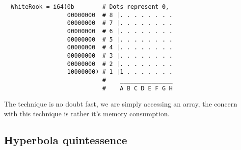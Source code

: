 \newpage
\begin{verbatim}
  WhiteRook = i64(0b        # Dots represent 0,
                  00000000  # 8 |. . . . . . . .
                  00000000  # 7 |. . . . . . . .
                  00000000  # 6 |. . . . . . . .
                  00000000  # 5 |. . . . . . . .
                  00000000  # 4 |. . . . . . . .
                  00000000  # 3 |. . . . . . . .
                  00000000  # 2 |. . . . . . . .
                  10000000) # 1 |1 . . . . . . .
                            #    _______________
                            #    A B C D E F G H
\end{verbatim}

The technique is no doubt fast, we are simply accessing
an array, the concern with this technique is rather it's
memory consumption.

\subsection*{Hyperbola quintessence}
